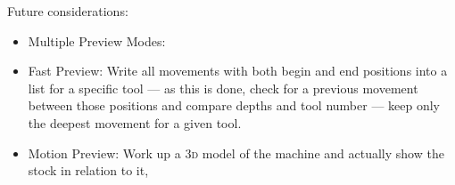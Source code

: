 \documentclass{ltxdoc}
\begin{document}
%
%
%
%

Future considerations:

\begin{itemize}
\item Multiple Preview Modes:
\item Fast Preview: Write all movements with both begin and end positions into a list for a specific tool --- as this is done, check for a previous movement between those positions and compare depths and tool number --- keep only the deepest movement for a given tool.
\item Motion Preview: Work up a \textsc{3d} model of the machine and actually show the stock in relation to it, 
\end{itemize}
\end{document}
